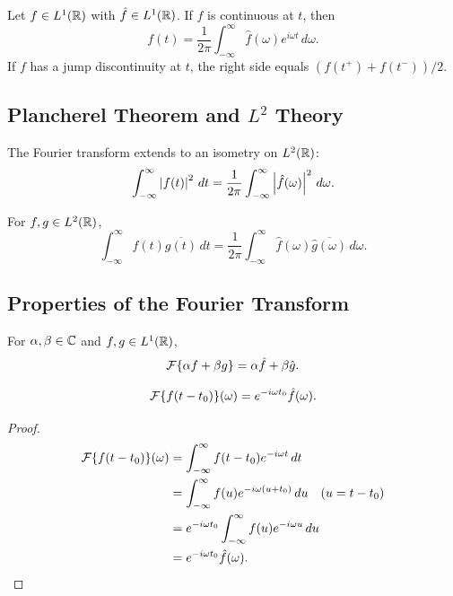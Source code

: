 \begin{notechapter}
\begin{theorem}
Let $f \in L^1(\mathbb{R})$ with $\hat{f} \in L^1(\mathbb{R})$. If $f$ is continuous at $t$, then
\[
f(t) = \frac{1}{2\pi} \int_{-\infty}^{\infty} \hat{f}(\omega) e^{i\omega t} \, d\omega.
\]
If $f$ has a jump discontinuity at $t$, the right side equals $(f(t^+) + f(t^-))/2$.
\end{theorem}

\subsection{Plancherel Theorem and $L^2$ Theory}

\begin{theorem}
The Fourier transform extends to an isometry on $L^2(\mathbb{R})$:
\[
\int_{-\infty}^{\infty} \left|f(t)\right|^2 \, dt = \frac{1}{2\pi} \int_{-\infty}^{\infty} \left|\hat{f}(\omega)\right|^2 \, d\omega.
\]
\end{theorem}

\begin{corollary}
For $f, g \in L^2(\mathbb{R})$,
\[
\int_{-\infty}^{\infty} f(t) \overline{g(t)} \, dt = \frac{1}{2\pi} \int_{-\infty}^{\infty} \hat{f}(\omega) \overline{\hat{g}(\omega)} \, d\omega.
\]
\end{corollary}

\subsection{Properties of the Fourier Transform}

\begin{proposition}[Linearity]
For $\alpha, \beta \in \mathbb{C}$ and $f, g \in L^1(\mathbb{R})$,
\[
\mathcal{F}\{\alpha f + \beta g\} = \alpha \hat{f} + \beta \hat{g}.
\]
\end{proposition}

\begin{proposition}
\[
\mathcal{F}\{f(t - t_0)\}(\omega) = e^{-i\omega t_0} \hat{f}(\omega).
\]
\end{proposition}

\begin{proof}
\begin{align*}
\mathcal{F}\{f(t - t_0)\}(\omega) &= \int_{-\infty}^{\infty} f(t - t_0) e^{-i\omega t} \, dt \\
&= \int_{-\infty}^{\infty} f(u) e^{-i\omega (u + t_0)} \, du \quad (u = t - t_0) \\
&= e^{-i\omega t_0} \int_{-\infty}^{\infty} f(u) e^{-i\omega u} \, du \\
&= e^{-i\omega t_0} \hat{f}(\omega).
\end{align*}
\end{proof}


\end{notechapter}
